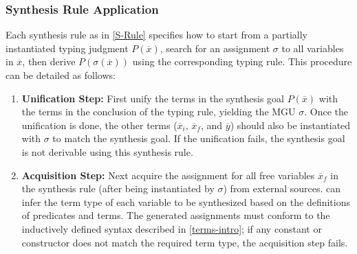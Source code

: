 \subsubsection{Synthesis Rule Application}
\label{sec:synthesis-rule-application}
Each synthesis rule as in \autoref{S-Rule} specifies how to start from a partially instantiated typing judgment $P(\overline{x})$, search for an assignment $\sigma$ to all variables in $\overline{x}$, then derive $P(\sigma(\overline{x}))$ using the corresponding typing rule. This procedure can be detailed as follows:
\begin{enumerate}
    \item \textbf{Unification Step:} First unify the terms in the synthesis goal $P(\overline{x})$ with the terms in the conclusion of the typing rule, yielding the MGU $\sigma$. Once the unification is done, the other terms ($\overline{x}_i$, $\overline{x}_f$, and $\overline{y}$) should also be instantiated with $\sigma$ to match the synthesis goal. If the unification fails, the synthesis goal is not derivable using this synthesis rule.
    
    
    \item \textbf{Acquisition Step:} Next acquire the assignment for all free variables $\overline{x}_f$ in the synthesis rule (after being instantiated by $\sigma$) from external sources. 
    \mainname can infer the term type of each variable to be synthesized based on the definitions of predicates and terms. The generated assignments must conform to the inductively defined syntax described in \autoref{terms-intro}; if any constant or constructor does not match the required term type, the acquisition step fails.
    
    

\end{enumerate}
